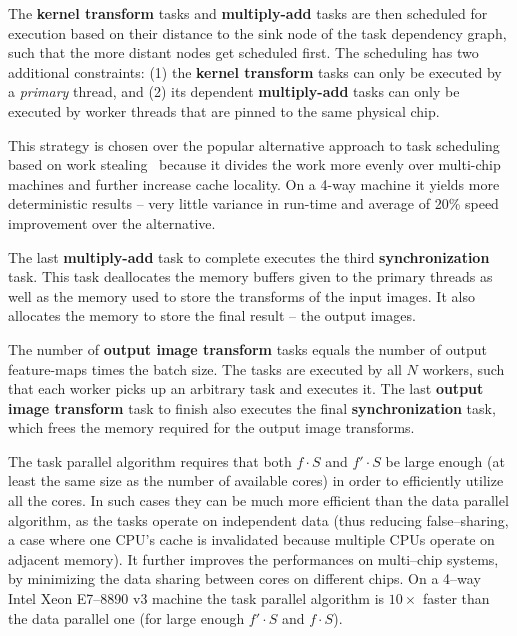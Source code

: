 \documentclass[conference]{IEEEtran}
\begin{document}
  The {\color{zblue}\bf kernel transform} tasks and {\color{zgreen}\bf
    multiply-add} tasks are then scheduled for execution based on
  their distance to the sink node of the task dependency graph, such
  that the more distant nodes get scheduled first.  The scheduling has
  two additional constraints: (1) the {\color{zblue}\bf kernel
    transform} tasks can only be executed by a \emph{primary} thread,
  and (2) its dependent {\color{zgreen}\bf multiply-add} tasks can
  only be executed by worker threads that are pinned to the same
  physical chip.

  This strategy is chosen over the popular alternative approach to
  task scheduling based on work stealing~\cite{reinders2007intel,
    willhalm2008putting} because it divides the work more evenly over
  multi-chip machines and further increase cache locality.  On a 4-way
  machine it yields more deterministic results -- very little variance
  in run-time and average of 20\% speed improvement over the
  alternative.

  The last {\color{zgreen}\bf multiply-add} task to complete executes
  the third {\color{zyellow}\bf synchronization} task.  This task
  deallocates the memory buffers given to the primary threads as well
  as the memory used to store the transforms of the input images.  It
  also allocates the memory to store the final result -- the output
  images.

  The number of {\color{zpurple}\bf output image transform} tasks
  equals the number of output feature-maps times the batch size.  The
  tasks are executed by all $N$ workers, such that each worker picks
  up an arbitrary task and executes it.  The last {\color{zpurple}\bf
    output image transform} task to finish also executes the final
  {\color{zyellow}\bf synchronization} task, which frees the memory
  required for the output image transforms.

  The task parallel algorithm requires that both $f \cdot S$ and $f'
  \cdot S$ be large enough (at least the same size as the number of
  available cores) in order to efficiently utilize all the cores.  In
  such cases they can be much more efficient than the data parallel
  algorithm, as the tasks operate on independent data (thus reducing
  false--sharing, a case where one CPU's cache is invalidated because
  multiple CPUs operate on adjacent memory).  It further improves the
  performances on multi--chip systems, by minimizing the data sharing
  between cores on different chips. On a 4--way Intel Xeon E7--8890 v3
  machine the task parallel algorithm is $10 \times$ faster than the
  data parallel one (for large enough $f' \cdot S$ and $f \cdot S$).
\end{document}
